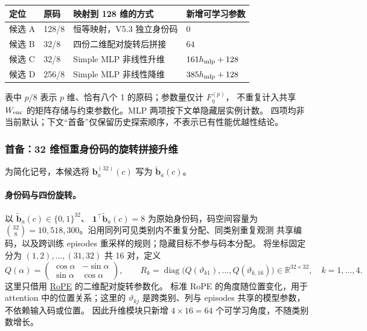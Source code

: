 \documentclass[11pt,UTF8,fontset=fandol]{ctexart}
\numberwithin{equation}{section}
\theoremstyle{definition}
\newcommand{\R}{\mathbb R}
\begin{document}
\begin{center}
\small
\begin{tabularx}{\linewidth}{l l X l}
\toprule
定位 & 原码 & 映射到 128 维的方式 & 新增可学习参数\\
\midrule
候选 A & 128/8 & 恒等映射，V5.3 独立身份码 & $0$\\
候选 B & 32/8 & 四份二维配对旋转后拼接 & $64$\\
候选 C & 32/8 & Simple MLP 非线性升维 & $161h_{\rm mlp}+128$\\
候选 D & 256/8 & Simple MLP 非线性降维 & $385h_{\rm mlp}+128$\\
\bottomrule
\end{tabularx}
\end{center}
表中 $p/8$ 表示 $p$ 维、恰有八个 1 的原码；参数量仅计 $F_\eta^{(p)}$，
不重复计入共享 $W_{\rm enc}$ 的矩阵存储与约束参数化。MLP 两项按下文单隐藏层实例计数。
四项均非当前默认；下文“首备”仅保留历史探索顺序，不表示已有性能优越性结论。

\subsubsection{首备：32 维恒重身份码的旋转拼接升维}
\label{subsec:alt:rotary-code}

为简化记号，本候选将 $\bm b_a^{(32)}(c)$ 写为 $\widetilde{\bm b}_a(c)$。

\paragraph{身份码与四份旋转。}
以 $\widetilde{\bm b}_a(c)\in\{0,1\}^{32}$、
$\bm1^\top\widetilde{\bm b}_a(c)=8$ 为原始身份码，码空间容量为
$\binom{32}{8}=10{,}518{,}300$。沿用同列可见类别内不重复分配、同类别重复观测
共享编码，以及跨训练 episodes 重采样的规则；隐藏目标不参与码本分配。
将坐标固定分为 $(1,2),\ldots,(31,32)$ 共 16 对，定义
\begin{equation}
 Q(\alpha)=
 \begin{pmatrix}\cos\alpha&-\sin\alpha\\\sin\alpha&\cos\alpha\end{pmatrix},
 \qquad
 R_k=\operatorname{diag}\bigl(Q(\vartheta_{k1}),\ldots,Q(\vartheta_{k,16})\bigr)
 \in\R^{32\times32},\quad k=1,\ldots,4.
 \label{eq:alt:rotary-blocks}
\end{equation}
这里只借用 \href{https://arxiv.org/abs/2104.09864}{RoPE} 的二维配对旋转参数化。
标准 RoPE 的角度随位置变化，用于 attention 中的位置关系；这里的
$\vartheta_{kj}$ 是跨类别、列与 episodes 共享的模型参数，不依赖输入码或位置。
因此升维模块只新增 $4\times16=64$ 个可学习角度，不随类别数增长。
\end{document}
